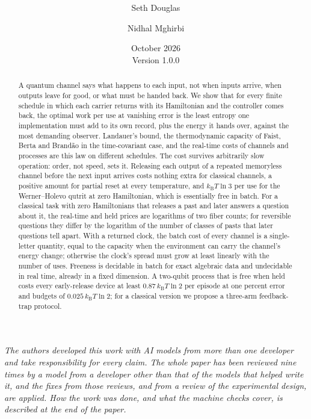 \documentclass[11pt]{article}
\title{\textbf{\papertitle}\ifx\papersubtitle\empty\else\\[6pt]\large\papersubtitle\fi}
\author{Seth Douglas \and Nidhal Mghirbi}
\date{October 2026 \\[2pt] {\small Version 1.0.0}}
\numberwithin{equation}{section}
\theoremstyle{definition}
\theoremstyle{remark}
\begin{document}
\maketitle

\begin{abstract}
A quantum channel says what happens to each input, not when inputs arrive, when outputs leave for good, or what must be handed back. We show that for every finite schedule in which each carrier returns with its Hamiltonian and the controller comes back, the optimal work per use at vanishing error is the least entropy one implementation must add to its own record, plus the energy it hands over, against the most demanding observer. Landauer's bound, the thermodynamic capacity of Faist, Berta and Brand\~ao in the time-covariant case, and the real-time costs of channels and processes are this law on different schedules. The cost survives arbitrarily slow operation: order, not speed, sets it. Releasing each output of a repeated memoryless channel before the next input arrives costs nothing extra for classical channels, a positive amount for partial reset at every temperature, and $k_{\mathrm B}T\ln3$ per use for the Werner--Holevo qutrit at zero Hamiltonian, which is essentially free in batch. For a classical task with zero Hamiltonians that releases a past and later answers a question about it, the real-time and held prices are logarithms of two fiber counts; for reversible questions they differ by the logarithm of the number of classes of pasts that later questions tell apart. With a returned clock, the batch cost of every channel is a single-letter quantity, equal to the capacity when the environment can carry the channel's energy change; otherwise the clock's spread must grow at least linearly with the number of uses. Freeness is decidable in batch for exact algebraic data and undecidable in real time, already in a fixed dimension. A two-qubit process that is free when held costs every early-release device at least $0.87\,k_{\mathrm B}T\ln2$ per episode at one percent error and budgets of $0.025\,k_{\mathrm B}T\ln2$; for a classical version we propose a three-arm feedback-trap protocol.
\end{abstract}

\noindent\emph{The authors developed this work with AI models from more than one developer and take responsibility for every claim. The whole paper has been reviewed nine times by a model from a developer other than that of the models that helped write it, and the fixes from those reviews, and from a review of the experimental design, are applied. How the work was done, and what the machine checks cover, is described at the end of the paper.}

\setcounter{tocdepth}{1}
{\small\tableofcontents}
\end{document}
